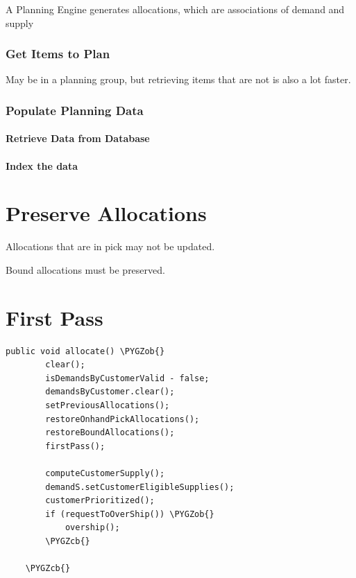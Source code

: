 \documentclass[letterpaper,10pt,english]{sphinxmanual}
\def\PYGZob{\char`\{}
\def\PYGZcb{\char`\}}
\begin{document}
A Planning Engine generates allocations, which are associations of
demand and supply


\subsubsection{Get Items to Plan}
\label{APS/ApsTechnical:get-items-to-plan}
May be in a planning group, but retrieving items that are not is also a
lot faster.


\subsubsection{Populate Planning Data}
\label{APS/ApsTechnical:populate-planning-data}

\paragraph{Retrieve Data from Database}
\label{APS/ApsTechnical:retrieve-data-from-database}

\paragraph{Index the data}
\label{APS/ApsTechnical:index-the-data}

\section{Preserve Allocations}
\label{APS/ApsTechnical:preserve-allocations}
Allocations that are in pick may not be updated.

Bound allocations must be preserved.


\section{First Pass}
\label{APS/ApsTechnical:first-pass}
\begin{Verbatim}[commandchars=\\\{\}]
public void allocate() \PYGZob{}
        clear();
        isDemandsByCustomerValid - false;
        demandsByCustomer.clear();
        setPreviousAllocations();
        restoreOnhandPickAllocations();
        restoreBoundAllocations();
        firstPass();

        computeCustomerSupply();
        demandS.setCustomerEligibleSupplies();
        customerPrioritized();
        if (requestToOverShip()) \PYGZob{}
            overship();
        \PYGZcb{}

    \PYGZcb{}
\end{Verbatim}
\end{document}
